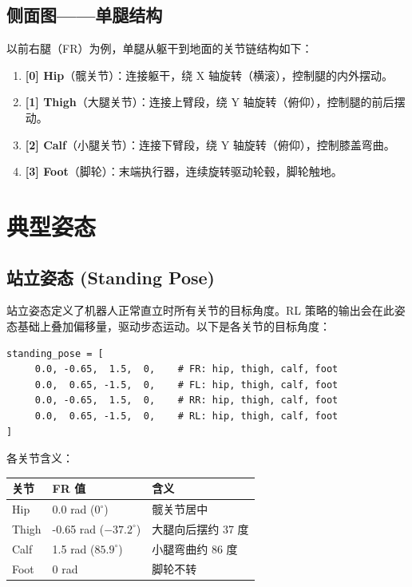 \documentclass[a4paper,11pt,openany]{book}
\newcommand{\degree}{^\circ}
\begin{document}
\subsection{侧面图------单腿结构}

以前右腿（FR）为例，单腿从躯干到地面的关节链结构如下：

\begin{enumerate}[nosep]
  \item \textbf{{[}0{]} Hip}（髋关节）：连接躯干，绕 X 轴旋转（横滚），控制腿的内外摆动。
  \item \textbf{{[}1{]} Thigh}（大腿关节）：连接上臂段，绕 Y 轴旋转（俯仰），控制腿的前后摆动。
  \item \textbf{{[}2{]} Calf}（小腿关节）：连接下臂段，绕 Y 轴旋转（俯仰），控制膝盖弯曲。
  \item \textbf{{[}3{]} Foot}（脚轮）：末端执行器，连续旋转驱动轮毂，脚轮触地。
\end{enumerate}

\section{典型姿态}

\subsection{站立姿态 (Standing Pose)}

站立姿态定义了机器人正常直立时所有关节的目标角度。RL 策略的输出会在此姿态基础上叠加偏移量，驱动步态运动。以下是各关节的目标角度：

\begin{lstlisting}[style=python]
standing_pose = [
     0.0, -0.65,  1.5,  0,    # FR: hip, thigh, calf, foot
     0.0,  0.65, -1.5,  0,    # FL: hip, thigh, calf, foot
     0.0, -0.65,  1.5,  0,    # RR: hip, thigh, calf, foot
     0.0,  0.65, -1.5,  0,    # RL: hip, thigh, calf, foot
]
\end{lstlisting}

各关节含义：

\begin{longtable}{lll}
\toprule
关节 & FR 值 & 含义 \\
\midrule
\endhead
Hip & 0.0 rad ($0\degree$) & 髋关节居中 \\
Thigh & -0.65 rad ($-37.2\degree$) & 大腿向后摆约 37 度 \\
Calf & 1.5 rad ($85.9\degree$) & 小腿弯曲约 86 度 \\
Foot & 0 rad & 脚轮不转 \\
\bottomrule
\end{longtable}
\end{document}
